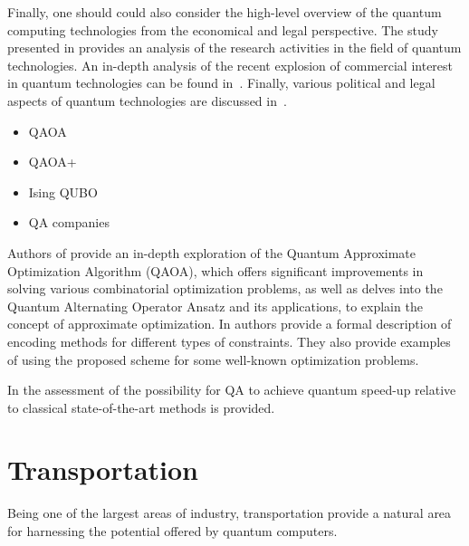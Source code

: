 \documentclass[a4paper,11pt]{article}
\begin{document}
Finally, one should could also consider the high-level overview of the quantum computing technologies from the economical and legal perspective.
The study presented in \cite{seskir2021landscape} provides an analysis of the research activities in the field of quantum technologies. An in-depth analysis of the recent explosion of commercial interest in quantum technologies can be found in~\cite{seskir2022landscape}. Finally, various political and legal aspects of quantum technologies are discussed in~\cite{hoofnagle2021law}. 



\begin{itemize}
\item 
QAOA \cite{farhi2014quantum}

\item QAOA+ \cite{hadfield2019quantum}

\item Ising  \cite{lucas2014ising} QUBO \cite{glover2018tutorial}

\item QA companies \cite{canivell2021startup}

\end{itemize}


Authors of \cite{choi2019tutorial} provide an in-depth exploration of the Quantum Approximate Optimization Algorithm (QAOA), which offers significant improvements in solving various combinatorial optimization problems, as well as delves into the Quantum Alternating Operator Ansatz and its applications,  to explain the concept of approximate optimization. In \cite{ruan2023quantum} authors provide a formal description of encoding methods for different types of constraints. They also provide examples of using the proposed scheme for some well-known optimization problems.

In \cite{crosson2021prospects} the assessment of the possibility for QA to 
achieve quantum speed-up relative to classical state-of-the-art methods is provided.

%
\section{Transportation}

Being one of the largest areas of industry, transportation provide a natural area for harnessing the potential offered by quantum computers. 
\end{document}
